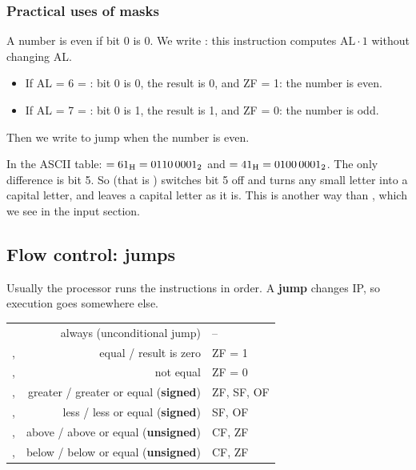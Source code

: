 \subsubsection{Practical uses of masks}
\begin{khatwa}
    A number is even if bit 0 is 0. We write : this instruction computes $\text{AL} \cdot 1$
    without changing AL.
    \begin{itemize}
        \item If AL = 6 = : bit 0 is 0, the result is 0, and ZF = 1: the number is even.
        \item If AL = 7 = : bit 0 is 1, the result is 1, and ZF = 0: the number is odd.
    \end{itemize}
    Then we write  to jump when the number is even.
\end{khatwa}

\begin{khatwa}
    In the ASCII table:  $= \mbox{61\textsubscript{H}} = \mbox{0110\,0001\textsubscript{2}}$ and  $= \mbox{41\textsubscript{H}} = \mbox{0100\,0001\textsubscript{2}}$.
    The only difference is bit 5. So  (that is ) switches bit 5 off and turns
    any small letter into a capital letter, and leaves a capital letter as it is. This is another way than
    , which we see in the input section.
\end{khatwa}

\subsection{Flow control: jumps}
Usually the processor runs the instructions in order. A \textbf{jump} changes IP, so execution goes somewhere else.

\begin{center}
\small
\begin{tabularx}{\linewidth}{|l|R|l|}
    \hline
     &  &  \\ \hline
     & always (unconditional jump) & -- \\ \hline
    ,  & equal / result is zero & ZF = 1 \\ \hline
    ,  & not equal & ZF = 0 \\ \hline
    ,  & greater / greater or equal (\textbf{signed}) & ZF, SF, OF \\ \hline
    ,  & less / less or equal (\textbf{signed}) & SF, OF \\ \hline
    ,  & above / above or equal (\textbf{unsigned}) & CF, ZF \\ \hline
    ,  & below / below or equal (\textbf{unsigned}) & CF, ZF \\ \hline
\end{tabularx}
\end{center}

